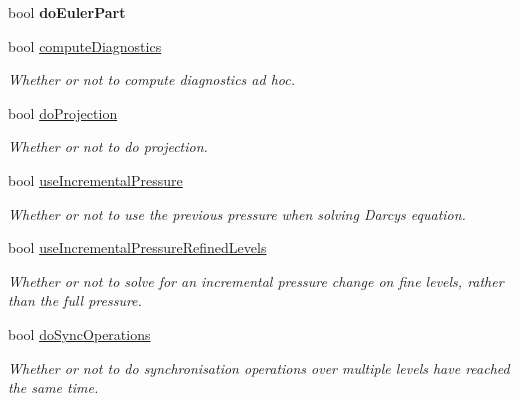 \begin{DoxyCompactItemize}
bool {\bfseries do\+Euler\+Part}
\item 
\mbox{\label{struct_mushy_layer_options_a94bd619c67b96acc2cda509f9e5dece4}} 
bool \hyperlink{struct_mushy_layer_options_a94bd619c67b96acc2cda509f9e5dece4}{compute\+Diagnostics}
\begin{DoxyCompactList}\small\item\em Whether or not to compute diagnostics ad hoc. \end{DoxyCompactList}\item 
\mbox{\label{struct_mushy_layer_options_ac0eb138e4101ea848084c498d668ac52}} 
bool \hyperlink{struct_mushy_layer_options_ac0eb138e4101ea848084c498d668ac52}{do\+Projection}
\begin{DoxyCompactList}\small\item\em Whether or not to do projection. \end{DoxyCompactList}\item 
bool \hyperlink{struct_mushy_layer_options_a0ee4602f8acbf255e32a89397409a67c}{use\+Incremental\+Pressure}
\begin{DoxyCompactList}\small\item\em Whether or not to use the previous pressure when solving Darcy\textquotesingle{}s equation. \end{DoxyCompactList}\item 
bool \hyperlink{struct_mushy_layer_options_a58be59c481f1d2f2283b943c723cb73f}{use\+Incremental\+Pressure\+Refined\+Levels}
\begin{DoxyCompactList}\small\item\em Whether or not to solve for an incremental pressure change on fine levels, rather than the full pressure. \end{DoxyCompactList}\item 
\mbox{\label{struct_mushy_layer_options_ad46eb0969cc8b7dbcbba0e719aa33b25}} 
bool \hyperlink{struct_mushy_layer_options_ad46eb0969cc8b7dbcbba0e719aa33b25}{do\+Sync\+Operations}
\begin{DoxyCompactList}\small\item\em Whether or not to do synchronisation operations over multiple levels have reached the same time. \end{DoxyCompactList}\item 
\mbox{\label{struct_mushy_layer_options_a40bf0333dc4481f5a449785c58f16b76}} 

\end{DoxyCompactItemize}

